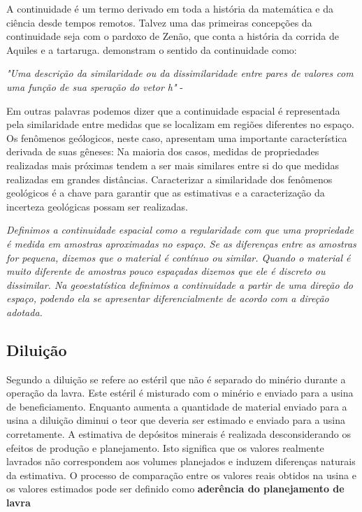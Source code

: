 A continuidade é um termo derivado em toda a história da matemática e da ciência desde tempos remotos. Talvez uma das primeiras concepções da continuidade seja com o pardoxo de Zenão, que conta a história da corrida de Aquiles e a tartaruga. \citet{srivastava1989robust} demonstram o sentido da continuidade como: 

\begin{remark}
	\textit{"Uma descrição da similaridade ou da dissimilaridade entre pares de valores com uma função de sua speração do vetor h"} - \cite{srivastava1989robust}
\end{remark}

Em outras palavras podemos dizer que a continuidade espacial é representada pela similaridade entre medidas que se localizam em regiões diferentes no espaço. Os fenômenos geólogicos, neste caso, apresentam uma importante característica derivada de suas gêneses: Na maioria dos casos, medidas de propriedades realizadas mais próximas tendem a ser mais similares entre si do que medidas realizadas em grandes distâncias. Caracterizar a similaridade dos fenômenos geológicos é a chave para garantir que as estimativas e a caracterização da incerteza geológicas possam ser realizadas. 

\begin{definition}
	\textit{Definimos a continuidade espacial como a regularidade com que uma propriedade é medida em amostras aproximadas no espaço. Se as diferenças entre as amostras for pequena, dizemos que o material é contínuo ou similar. Quando o material é muito diferente de amostras pouco espaçadas dizemos que ele é discreto ou dissimilar. Na geoestatística definimos a continuidade a partir de uma direção do espaço, podendo ela se apresentar diferencialmente de acordo com a direção adotada.}
\end{definition}

\subsection{Diluição}

Segundo \citet{susaeta2008dilution} a diluição se refere ao estéril que não é separado do minério durante a operação da lavra. Este estéril é misturado com o minério e enviado para a usina de beneficiamento. Enquanto aumenta  a quantidade de material enviado para a usina a diluição diminui o teor que deveria ser estimado e enviado para a usina corretamente. A estimativa de depósitos minerais é realizada desconsiderando os efeitos de produção e planejamento. Isto significa que os valores realmente lavrados não correspondem aos volumes planejados e induzem diferenças naturais da estimativa. O processo de comparação entre os valores reais obtidos na usina e os valores estimados pode ser definido como \textbf{aderência do planejamento de lavra} 


